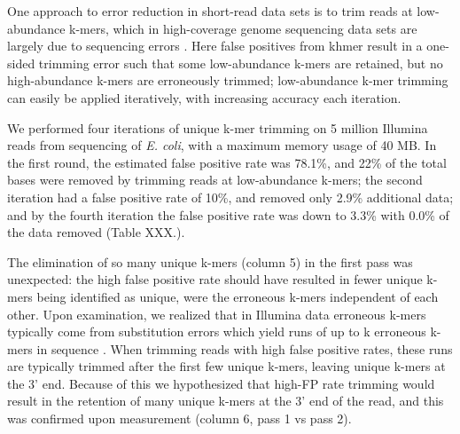 \documentclass{article}
\begin{document}
One approach to error reduction in short-read data sets is to trim
reads at low-abundance k-mers, which in high-coverage genome
sequencing data sets are largely due to sequencing errors \cite{Kelley2010}.
Here false positives from khmer result in a one-sided trimming
error such that some low-abundance k-mers are retained, but no
high-abundance k-mers are erroneously trimmed; low-abundance k-mer
trimming can easily be applied iteratively, with increasing accuracy
each iteration.

We performed four iterations of unique k-mer trimming on 5 million
Illumina reads from sequencing of {\em E. coli}, with a maximum memory
usage of 40 MB.  In the first round, the estimated false positive
rate was 78.1\%, and 22\% of the total bases were removed by trimming
reads at low-abundance k-mers; the second iteration had a false
positive rate of 10\%, and removed only 2.9\% additional data; and by
the fourth iteration the false positive rate was down to 3.3\% with 0.0\% of the data removed (Table XXX.).

\begin{table}[ht]
\caption{Iterative low-memory k-mer trimming.  The results of trimming
  reads at unique (erroneous) k-mers from a 165 Mbp short-read data
  set in under 40 MB of RAM.  After each iteration, we measured the
  total number of distinct k-mers in the data set, the total number
  of unique (and likely erroneous) k-mers remaining, and the
  number of unique k-mers present at the 3' end of reads.}

\end{table}

The elimination of so many unique k-mers (column 5) in the first pass
was unexpected: the high false positive rate should have resulted in
fewer unique k-mers being identified as unique, were the erroneous
k-mers independent of each other. Upon examination, we realized that
in Illumina data erroneous k-mers typically come from substitution
errors which yield runs of up to k erroneous k-mers in sequence \cite{Kelley2010}.  When trimming reads with high false positive rates,
these runs are typically trimmed after the first few unique k-mers,
leaving unique k-mers at the 3' end.
Because of this we hypothesized that high-FP rate trimming would
result in the retention of many unique k-mers at the 3' end of the
read, and this was confirmed upon measurement (column 6, pass 1 vs
pass 2).
\end{document}
